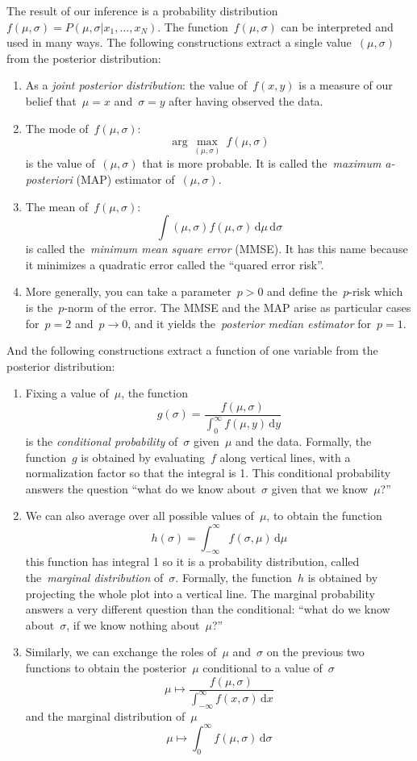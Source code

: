 \bigskip

The result of our inference is a probability
distribution~$f(\mu,\sigma)=P(\mu,\sigma|x_1,\ldots,x_N)$.  The
function~$f(\mu,\sigma)$ can be interpreted and used in many ways.  The
following constructions extract a single value~$(\mu,\sigma)$ from
the posterior distribution:

\begin{enumerate}
	\item As a \emph{joint posterior  distribution}: the value
		of~$f(x,y)$ is a measure of our belief that~$\mu=x$
		and~$\sigma=y$ after having observed the data.
	\item The mode of~$f(\mu,\sigma)$:
		$$
		\arg\max_{(\mu,\sigma)}\ f(\mu,\sigma)
		$$
		is the value of~$(\mu,\sigma)$ that is more probable.
		It is called the~\emph{maximum a-posteriori} (MAP) estimator
		of~$(\mu,\sigma)$.
	\item The mean of~$f(\mu,\sigma)$:
		$$
		\int (\mu,\sigma)f(\mu,\sigma)
		\,\mathrm{d}\mu
		\,\mathrm{d}\sigma
		$$
		is called the~\emph{minimum mean square error} (MMSE).
		It has this name because it minimizes a quadratic error
		called the ``quared error risk''.
	\item More generally, you can take a parameter~$p>0$ and define
		the~$p$-risk which is the~$p$-norm of the error.  The MMSE
		and the MAP arise as particular cases for~$p=2$ and~$p\to0$,
		and it yields the~\emph{posterior median estimator}
		for~$p=1$.
\end{enumerate}

And the following constructions extract a function of one variable from the
posterior distribution:

\begin{enumerate}
	\item Fixing a value of~$\mu$, the function
		$$
		g(\sigma)=\frac{f(\mu,\sigma)}{\int_0^\infty
		f(\mu,y)\,\mathrm{d}y}
		$$
		is the \emph{conditional probability} of~$\sigma$ given~$\mu$
		and the data.  Formally, the function~$g$ is obtained by
		evaluating~$f$ along vertical lines, with a normalization
		factor so that the integral is 1.
		This conditional probability answers the question ``what do
		we know about~$\sigma$ given that we know~$\mu$?''
	\item We can also average over all possible values of~$\mu$, to
		obtain the function
		$$
		h(\sigma)=\int_{-\infty}^\infty
		f(\sigma,\mu)\,\mathrm{d}\mu
		$$
		this function has integral 1 so it is a probability
		distribution, called the~\emph{marginal distribution}
		of~$\sigma$.  Formally, the function~$h$ is obtained by
		projecting the whole plot into a vertical line.
		The marginal probability answers a very different question
		than the conditional: ``what do we know about~$\sigma$, if we
		know nothing about~$\mu$?''
	\item Similarly, we can exchange the roles of~$\mu$ and~$\sigma$ on
		the previous two functions to obtain the posterior~$\mu$
		conditional to a value of~$\sigma$
		$$
		\mu\mapsto\frac{f(\mu,\sigma)}{\int_{-\infty}^\infty
		f(x,\sigma)\,\mathrm{d}x}
		$$
		and the marginal distribution of~$\mu$
		$$
		\mu\mapsto\int_0^\infty
		f(\mu,\sigma)\,\mathrm{d}\sigma
		$$
\end{enumerate}

